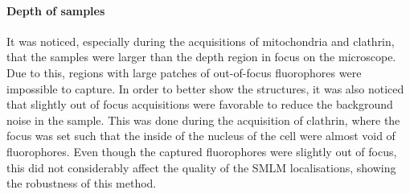 \paragraph{Depth of samples}
It was noticed, especially during the acquisitions of mitochondria and clathrin, that the samples were larger than the depth region in focus on the microscope. Due to this, regions with large patches of out-of-focus fluorophores were impossible to capture. In order to better show the structures, it was also noticed that slightly out of focus acquisitions were favorable to reduce the background noise in the sample. This was done during the acquisition of clathrin, where the focus was set such that the inside of the nucleus of the cell were almost void of fluorophores. Even though the captured fluorophores were slightly out of focus, this did not considerably affect the quality of the SMLM localisations, showing the robustness of this method.
